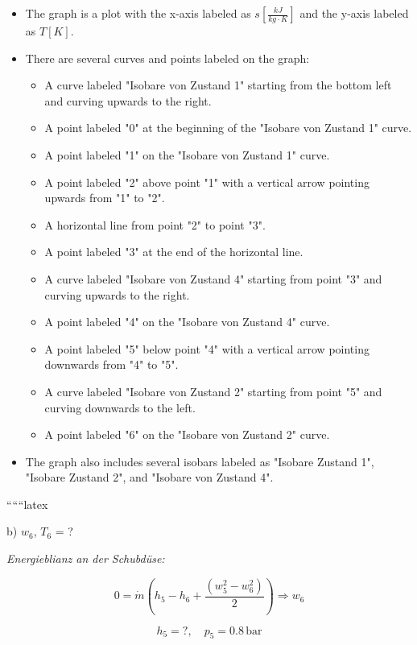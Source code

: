 \begin{itemize}
    \item The graph is a plot with the x-axis labeled as $s \left[ \frac{kJ}{kg \cdot K} \right]$ and the y-axis labeled as $T \left[ K \right]$.
    \item There are several curves and points labeled on the graph:
        \begin{itemize}
            \item A curve labeled "Isobare von Zustand 1" starting from the bottom left and curving upwards to the right.
            \item A point labeled "0" at the beginning of the "Isobare von Zustand 1" curve.
            \item A point labeled "1" on the "Isobare von Zustand 1" curve.
            \item A point labeled "2" above point "1" with a vertical arrow pointing upwards from "1" to "2".
            \item A horizontal line from point "2" to point "3".
            \item A point labeled "3" at the end of the horizontal line.
            \item A curve labeled "Isobare von Zustand 4" starting from point "3" and curving upwards to the right.
            \item A point labeled "4" on the "Isobare von Zustand 4" curve.
            \item A point labeled "5" below point "4" with a vertical arrow pointing downwards from "4" to "5".
            \item A curve labeled "Isobare von Zustand 2" starting from point "5" and curving downwards to the left.
            \item A point labeled "6" on the "Isobare von Zustand 2" curve.
        \end{itemize}
    \item The graph also includes several isobars labeled as "Isobare Zustand 1", "Isobare Zustand 2", and "Isobare von Zustand 4".
\end{itemize}

``````latex


b) $w_6$, $T_6$ = ?

\textit{Energieblianz an der Schubdüse:}

\[
0 = \dot{m} (h_5 - h_6 + \frac{(w_5^2 - w_6^2)}{2}) \Rightarrow w_6
\]

\[
h_5 = ?, \quad p_5 = 0.8 \, \text{bar}
\]

